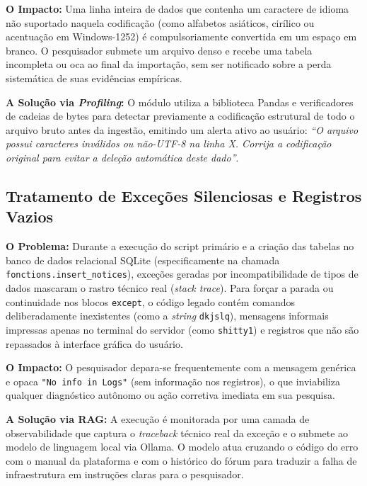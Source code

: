 \documentclass[
	oneside,
	a4paper,
	12pt,
	chapter=TITLE,
	section=TITLE,
	english,
	brazilian
]{abntex2}
\begin{document}
\begin{apendicesenv}
\textbf{O Impacto:} Uma linha inteira de dados que contenha um caractere de idioma não suportado naquela codificação (como alfabetos asiáticos, cirílico ou acentuação em Windows-1252) é compulsoriamente convertida em um espaço em branco. O pesquisador submete um arquivo denso e recebe uma tabela incompleta ou oca ao final da importação, sem ser notificado sobre a perda sistemática de suas evidências empíricas.

\textbf{A Solução via \textit{Profiling}:} O módulo utiliza a biblioteca Pandas e verificadores de cadeias de bytes para detectar previamente a codificação estrutural de todo o arquivo bruto antes da ingestão, emitindo um alerta ativo ao usuário: \textit{``O arquivo possui caracteres inválidos ou não-UTF-8 na linha X. Corrija a codificação original para evitar a deleção automática deste dado''}.

\FloatBarrier
\subsection{Tratamento de Exceções Silenciosas e Registros Vazios}\label{sec:tratamento_de_excecoes_silenciosas_e_reg}


\textbf{O Problema:} Durante a execução do script primário e a criação das tabelas no banco de dados relacional SQLite (especificamente na chamada \texttt{fonctions.\allowbreak insert\_\allowbreak notices}), exceções geradas por incompatibilidade de tipos de dados mascaram o rastro técnico real (\textit{stack trace}). Para forçar a parada ou continuidade nos blocos \texttt{except}, o código legado contém comandos deliberadamente inexistentes (como a \textit{string} \texttt{dkjslq}), mensagens informais impressas apenas no terminal do servidor (como \texttt{shitty1}) e registros que não são repassados à interface gráfica do usuário.

\textbf{O Impacto:} O pesquisador depara-se frequentemente com a mensagem genérica e opaca \texttt{"No info in Logs"} (sem informação nos registros), o que inviabiliza qualquer diagnóstico autônomo ou ação corretiva imediata em sua pesquisa.

\textbf{A Solução via RAG:} A execução é monitorada por uma camada de observabilidade que captura o \textit{traceback} técnico real da exceção e o submete ao modelo de linguagem local via Ollama. O modelo atua cruzando o código do erro com o manual da plataforma e com o histórico do fórum para traduzir a falha de infraestrutura em instruções claras para o pesquisador.


\end{apendicesenv}
\end{document}
